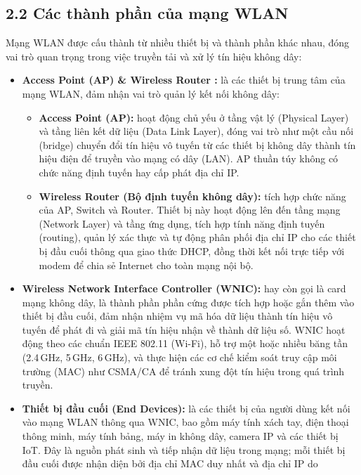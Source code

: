 \subsection{2.2 Các thành phần của mạng WLAN\cite{kurose2017,gfg_network_devices} }
Mạng WLAN được cấu thành từ nhiều thiết bị và thành phần khác nhau, đóng vai trò quan trọng trong việc truyền tải và xử lý tín hiệu không dây:
\begin{itemize}
    \item \textbf{Access Point (AP) \& Wireless Router :} là các thiết bị trung tâm của mạng WLAN, đảm nhận vai trò quản lý kết nối không dây:
        \begin{itemize}
            \item \textbf{Access Point (AP):} hoạt động chủ yếu ở tầng vật lý (Physical Layer) và tầng liên kết dữ liệu (Data Link Layer), đóng vai trò như một cầu nối (bridge) chuyển đổi tín hiệu vô tuyến từ các thiết bị không dây thành tín hiệu điện để truyền vào mạng có dây (LAN). AP thuần túy không có chức năng định tuyến hay cấp phát địa chỉ IP.
            \item \textbf{Wireless Router (Bộ định tuyến không dây):} tích hợp chức năng của AP, Switch và Router. Thiết bị này hoạt động lên đến tầng mạng (Network Layer) và tầng ứng dụng, tích hợp tính năng định tuyến (routing), quản lý xác thực và tự động phân phối địa chỉ IP cho các thiết bị đầu cuối thông qua giao thức DHCP, đồng thời kết nối trực tiếp với modem để chia sẻ Internet cho toàn mạng nội bộ.
        \end{itemize}
    \item \textbf{Wireless Network Interface Controller (WNIC):} hay còn gọi là card mạng không 
    dây, là thành phần phần cứng được tích hợp hoặc gắn thêm vào thiết bị đầu cuối, đảm nhận 
    nhiệm vụ mã hóa dữ liệu thành tín hiệu vô tuyến để phát đi và giải mã tín hiệu nhận về thành 
    dữ liệu số. WNIC hoạt động theo các chuẩn IEEE 802.11 (Wi-Fi), hỗ trợ một hoặc nhiều băng tần 
    (2.4\,GHz, 5\,GHz, 6\,GHz), và thực hiện các cơ chế kiểm soát truy cập môi trường (MAC) như 
    CSMA/CA để tránh xung đột tín hiệu trong quá trình truyền.
    \item \textbf{Thiết bị đầu cuối (End Devices):} là các thiết bị của người dùng kết nối vào 
    mạng WLAN thông qua WNIC, bao gồm máy tính xách tay, điện thoại thông minh, máy tính bảng, 
    máy in không dây, camera IP và các thiết bị IoT. Đây là nguồn phát sinh và tiếp nhận dữ liệu 
    trong mạng; mỗi thiết bị đầu cuối được nhận diện bởi địa chỉ MAC duy nhất và địa chỉ IP do 

\end{itemize}
